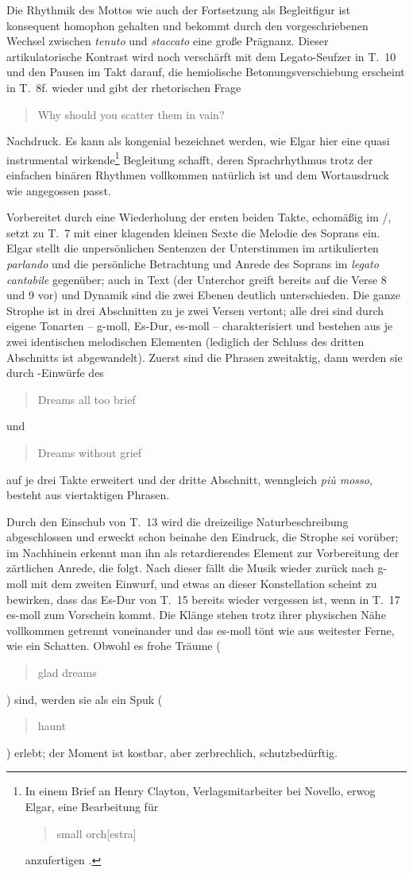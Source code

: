 \documentclass[a4paper,11pt,open=any]{scrbook}
\newcommand{\engquote}[1]{\foreignblockquote{english}{#1}}
\begin{document}
Die Rhythmik des Mottos wie auch der Fortsetzung als Begleitfigur ist
konsequent homophon gehalten und bekommt durch den vorgeschriebenen Wechsel
zwischen \textit{tenuto} und \textit{staccato} eine große Prägnanz.  Dieser
artikulatorische Kontrast wird noch verschärft mit dem Legato-Seufzer in
T.~10 und den Pausen im Takt darauf, die hemiolische Betonungsverschiebung
erscheint in T.~8f. wieder und gibt der rhetorischen Frage \engquote{Why
should you scatter them in vain?} Nachdruck.  Es kann als kongenial
bezeichnet werden, wie Elgar hier eine quasi instrumental wirkende\footnote{In
einem Brief an Henry Clayton, Verlagsmitarbeiter bei Novello, erwog Elgar,
eine Bearbeitung für \engquote{small orch[estra]} anzufertigen \parencite
[Bd.~2, S.~778]{elgar-publ}.} Begleitung schafft, deren Sprachrhythmus
trotz der einfachen binären Rhythmen vollkommen natürlich ist und dem
Wortausdruck wie angegossen passt.

Vorbereitet durch eine Wiederholung der ersten beiden Takte, echomäßig
im /, setzt zu T.~7 mit einer klagenden
kleinen Sexte die Melodie des Soprans ein.  Elgar stellt die unpersönlichen
Sentenzen der Unterstimmen im artikulierten \textit{parlando} und die
persönliche Betrachtung und Anrede des Soprans im \textit{legato cantabile}
gegenüber; auch in Text (der Unterchor greift bereits auf die Verse 8 und
9 vor) und Dynamik sind die zwei Ebenen deutlich unterschieden.  Die ganze
Strophe ist in drei Abschnitten zu je zwei Versen vertont; alle drei sind
durch eigene Tonarten – g-moll, Es-Dur, es-moll – charakterisiert und
bestehen aus je zwei identischen melodischen Elementen (lediglich der Schluss
des dritten Abschnitts ist abgewandelt).  Zuerst sind die Phrasen zweitaktig,
dann werden sie durch -Einwürfe des \engquote{Dreams all too
brief} und \engquote{Dreams without grief} auf je drei Takte erweitert und
der dritte Abschnitt, wenngleich \textit{più mosso}, besteht aus viertaktigen
Phrasen.

Durch den Einschub von T.~13 wird die dreizeilige Naturbeschreibung
abgeschlossen und erweckt schon beinahe den Eindruck, die Strophe sei
vorüber; im Nachhinein erkennt man ihn als retardierendes Element zur
Vorbereitung der zärtlichen Anrede, die folgt.  Nach dieser fällt die
Musik wieder zurück nach g-moll mit dem zweiten Einwurf, und etwas an
dieser Konstellation scheint zu bewirken, dass das Es-Dur von T.~15
bereits wieder vergessen ist, wenn in T.~17 es-moll zum Vorschein kommt.
Die Klänge stehen trotz ihrer physischen Nähe vollkommen getrennt
voneinander und das es-moll tönt  wie aus weitester
Ferne, wie ein Schatten.  Obwohl es frohe Träume (\engquote{glad dreams})
sind, werden sie als ein Spuk (\engquote{haunt}) erlebt; der Moment ist
kostbar, aber zerbrechlich, schutzbedürftig.
\end{document}

